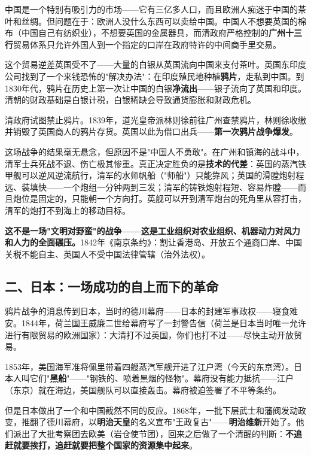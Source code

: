\documentclass[a4paper,12pt]{ctexart}
\begin{document}
中国是一个特别有吸引力的市场——它有三亿多人口，而且欧洲人痴迷于中国的茶叶和丝绸。但问题在于：欧洲人没什么东西可以卖给中国。中国人不想要英国的棉布（中国自己有纺织业），不想要英国的金属器具，而清政府严格控制的\textbf{广州十三行}贸易体系只允许外国人到一个指定的口岸在政府特许的中间商手里交易。

这个贸易逆差英国受不了——大量的白银从英国流向中国来支付茶叶。英国东印度公司找到了一个来钱恐怖的"解决办法"：在印度殖民地种植\textbf{鸦片}，走私到中国。到1830年代，鸦片在历史上第一次让中国的白银\textbf{净流出}——银子流向了英国和印度。清朝的财政基础是白银计税，白银稀缺会导致通货膨胀和财政危机。

清政府试图禁止鸦片。1839年，道光皇帝派林则徐前往广州查禁鸦片，林则徐收缴并销毁了英国商人的鸦片存货。英国以此为借口出兵——\textbf{第一次鸦片战争爆发}。

这场战争的结果毫无悬念，但原因不是"中国人不勇敢"。在广州和镇海的战斗中，清军士兵死战不退、伤亡极其惨重。真正决定胜负的是\textbf{技术的代差}：英国的蒸汽铁甲舰可以逆风逆流航行，清军的水师帆船（"师船"）只能靠风；英国的滑膛炮射程远、装填快——一个炮组一分钟两到三发；清军的铸铁炮射程短、容易炸膛——而且炮位是固定的，只能朝一个方向打。英舰可以开到清军炮台的死角里从容打击，清军的炮打不到海上的移动目标。

\textbf{这不是一场"文明对野蛮"的战争——这是工业组织对农业组织、机器动力对风力和人力的全面碾压。}1842年《南京条约》：割让香港岛、开放五个通商口岸、中国关税不能自主、英国人不受中国法律管辖（治外法权）。

\subsection*{二、日本：一场成功的自上而下的革命}

鸦片战争的消息传到日本，当时的德川幕府——日本的封建军事政权——寝食难安。1844年，荷兰国王威廉二世给幕府写了一封警告信（荷兰是日本当时唯一允许进行有限贸易的欧洲国家）：大清打不过英国，你们也打不过——尽快主动开放贸易。

1853年，美国海军准将佩里带着四艘蒸汽军舰开进了江户湾（今天的东京湾）。日本人叫它们"\textbf{黑船}"——"钢铁的、喷着黑烟的怪物"。幕府没有能力抵抗——江户（东京）就在海边，美国舰队可以直接轰击。幕府被迫签署了不平等条约。

但是日本做出了一个和中国截然不同的反应。1868年，一批下层武士和藩阀发动政变，推翻了德川幕府，以\textbf{明治天皇}的名义宣布"王政复古"——\textbf{明治维新}开始了。他们派出了大批考察团去欧美（岩仓使节团），回来之后做了一个清醒的判断：\textbf{不追赶就要挨打，追赶就要把整个国家的资源集中起来}。
\end{document}
